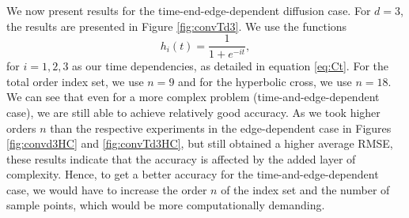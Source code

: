 \documentclass[12pt, oneside]{report}   	%
\begin{document}
We now present results for the time-end-edge-dependent diffusion case. For $d=3$, the results are presented in Figure \ref{fig:convTd3}. We use the functions
$$
h_i(t)=\frac{1}{1+e^{-it}},
$$
for $i=1,2,3$ as our time dependencies, as detailed in equation \eqref{eq:Ct}. For the total order index set, we use $n=9$ and for the hyperbolic cross, we use $n=18$. We can see that even for a more complex problem (time-and-edge-dependent case), we are still able to achieve relatively good accuracy. As we took higher orders $n$ than the respective experiments in the edge-dependent case in Figures \ref{fig:convd3HC} and \ref{fig:convTd3HC}, but still obtained a higher average RMSE, these results indicate that the accuracy is affected by the added layer of complexity. Hence, to get a better accuracy for the time-and-edge-dependent case, we would have to increase the order $n$ of the index set and the number of sample points, which would be more computationally demanding.\\\\
\end{document}
